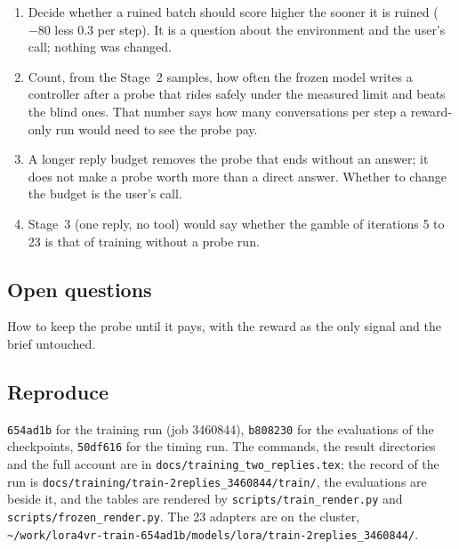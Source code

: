 \documentclass[11pt,a4paper]{article}
\newcommand{\commit}[1]{\texttt{\textcolor{commitgray}{#1}}}
\begin{document}
\begin{enumerate}[nosep]
\item Decide whether a ruined batch should score higher the sooner it is
  ruined ($-80$ less 0.3 per step). It is a question about the environment
  and the user's call; nothing was changed.
\item Count, from the Stage~2 samples, how often the frozen model writes a
  controller after a probe that rides safely under the measured limit and
  beats the blind ones. That number says how many conversations per step a
  reward-only run would need to see the probe pay.
\item A longer reply budget removes the probe that ends without an answer;
  it does not make a probe worth more than a direct answer. Whether to
  change the budget is the user's call.
\item Stage~3 (one reply, no tool) would say whether the gamble of
  iterations 5 to 23 is that of training without a probe run.
\end{enumerate}

\subsection*{Open questions}

How to keep the probe until it pays, with the reward as the only signal and
the brief untouched.

\subsection*{Reproduce}

\begin{sloppypar}
\commit{654ad1b} for the training run (job 3460844), \commit{b808230} for
the evaluations of the checkpoints, \commit{50df616} for the timing run.
The commands, the result directories and the full account are in
\texttt{docs/training\_two\_replies.tex}; the record of the run is
\texttt{docs/training/train-2replies\_3460844/train/}, the evaluations are
beside it, and the tables are rendered by \texttt{scripts/train\_render.py}
and \texttt{scripts/frozen\_render.py}. The 23 adapters are on the cluster,
\texttt{\textasciitilde/work/lora4vr-train-654ad1b/models/lora/train-2replies\_3460844/}.
\end{sloppypar}
\end{document}
